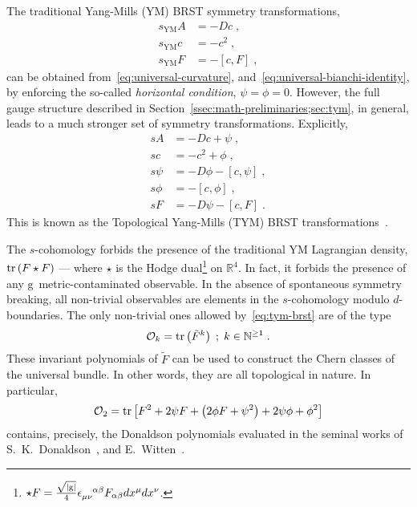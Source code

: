 \documentclass[main.tex]{subfiles}
\begin{document}
The traditional Yang-Mills (YM) BRST symmetry transformations,
\begin{subequations}\label{eq:ym-brst}
  \begin{align}
    s_{\text{YM}}A & = -Dc \;,                   \\
    s_{\text{YM}}c & = - c^2 \;,                 \\
    s_{\text{YM}}F & = - \left[ c, F \right] \;,
  \end{align}
\end{subequations}
can be obtained from~\eqref{eq:universal-curvature}, and~\eqref{eq:universal-bianchi-identity}, by enforcing the so-called \emph{horizontal condition}, $\psi=\phi=0$. However, the full gauge structure described in Section~\ref{ssec:math-preliminaries;sec:tym}, in general, leads to a much stronger set of symmetry transformations. Explicitly,
\begin{subequations}\label{eq:tym-brst}
  \begin{align}
    sA    & = -Dc + \psi \;,                      \\
    sc    & = - c^2 + \phi \;,                    \\
    s\psi & = -D\phi - \left[ c, \psi \right] \;, \\
    s\phi & = - \left[ c, \phi \right]\;,         \\
    sF    & = -D\psi - \left[ c, F \right] \;.
  \end{align}
\end{subequations}
This is known as the Topological Yang-Mills (TYM) BRST transformations~\cite{baulieu1988a}.

The $ s $-cohomology forbids the presence of the traditional YM Lagrangian density, $ \operatorname{tr} \left( F \star F \right) $ --- where $ \star $ is the Hodge dual\footnote{ $ \star F = \frac{ \sqrt{ |\mathrm{g}| } }{ 4 } \tensor{ \epsilon }{ _{\mu \nu}^{\alpha \beta} } F_{\alpha \beta} dx^\mu dx^\nu $. } on $ \mathbb{R}^4 $. In fact, it forbids the presence of any $ \mathrm{g} $~metric-contaminated observable. In the absence of spontaneous symmetry breaking, all non-trivial observables are elements in the $s$-cohomology modulo $d$-boundaries. The only non-trivial ones allowed by~\eqref{eq:tym-brst} are of the type
\begin{equation}\label{eq:tym-observables}
  \mathcal{O}_k = \operatorname{tr} \left( \tilde{F}^k \right) \; ; \; k \in {\mathbb{N}}^{\ge 1} \;.
\end{equation}
These invariant polynomials of $\tilde{F}$ can be used to construct the Chern classes of the universal bundle. In other words, they are all topological in nature. In particular,
\begin{equation}\label{eq:donaldson-polynomials}
  \mathcal{O}_2 = \operatorname{tr} \left[ F^2 + 2\psi F + \left( 2\phi F + \psi^2 \right) + 2\psi \phi + \phi^2\right]
\end{equation}
contains, precisely, the Donaldson polynomials evaluated in the seminal works of S.~K.~Donaldson~\cite{donaldson1983a,donaldson1990a}, and E.~Witten~\cite{witten1988d}.
\end{document}
